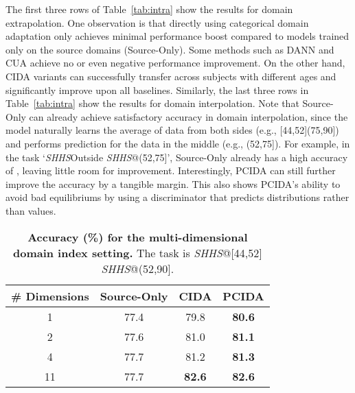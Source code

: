 \documentclass{article}
\newcommand{\tabref}[1]{Table~\ref{#1}}
\begin{document}
The first three rows of \tabref{tab:intra} show the results for domain extrapolation. One observation is that directly using categorical domain adaptation only achieves minimal performance boost compared to models trained only on the source domains (Source-Only). Some methods such as DANN and CUA achieve no or even negative performance improvement. On the other hand, CIDA variants can successfully transfer across subjects with different ages and significantly improve upon all baselines. Similarly, the last three rows in \tabref{tab:intra} show the results for domain interpolation. Note that Source-Only can already achieve satisfactory accuracy in domain interpolation, since the model naturally learns the average of data from both sides (e.g., [44,52](75,90]) and performs prediction for the data in the middle (e.g., (52,75]). For example, in the task `\emph{SHHS}Outside  \emph{SHHS}@(52,75]', Source-Only already has a high accuracy of , leaving little room for improvement. Interestingly, PCIDA can still further improve the accuracy by a tangible margin. This also shows PCIDA's ability to avoid bad equilibriums by using a discriminator that predicts distributions rather than values.

\begin{table}[t]
\begin{footnotesize}
\vskip -2mm
\begin{center}
\caption{\textbf{Accuracy (\%) for the multi-dimensional domain index setting.} The task is \emph{SHHS}@[44,52]  \emph{SHHS}@(52,90].}
\label{tab:multi}
\vskip 1mm
\begin{tabular}{cccc}
\hline
\# Dimensions  & Source-Only  & CIDA & PCIDA \\
\hline
 1 & 77.4 & 79.8 & \textbf{80.6} \\
 2 & 77.6 & 81.0 & \textbf{81.1} \\
 4 & 77.7 & 81.2 & \textbf{81.3} \\
11 & 77.7 & \textbf{82.6} & \textbf{82.6} \\
\hline
\end{tabular}
\end{center}
\vskip -6mm
\end{footnotesize}
\end{table}
\end{document}

